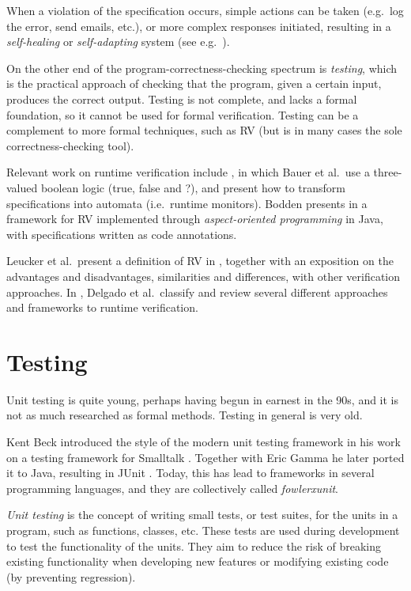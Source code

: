 \documentclass[a4paper,11pt]{kth-mag}
\begin{document}
When a violation of the specification occurs, simple actions can be taken
(e.g.\ log the error, send emails, etc.), or more complex responses initiated,
resulting in a \textit{self-healing} or \textit{self-adapting} system (see
e.g.\ \cite{huebscher08}).

On the other end of the program-correctness-checking spectrum is
\emph{testing}, which is the practical approach of checking that the program,
given a certain input, produces the correct output.  Testing is not complete,
and lacks a formal foundation, so it cannot be used for formal verification.
Testing can be a complement to more formal techniques, such as RV (but is in
many cases the sole correctness-checking tool).

Relevant work on runtime verification include \cite{bauer06}, in which Bauer et
al.\ use a three-valued boolean logic (true, false and ?), and present how to
transform specifications into automata (i.e.\ runtime monitors). Bodden
presents in \cite{bodden05efficientrv} a framework for RV implemented through
\emph{aspect-oriented programming} \cite{aspectj} in Java, with specifications
written as code annotations.

Leucker et al.\ present a definition of RV in \cite{leucker09abriefaccount},
together with an exposition on the advantages and disadvantages, similarities
and differences, with other verification approaches. In
\cite{delgado04taxonomy}, Delgado et al.\ classify and review several different
approaches and frameworks to runtime verification.


\section{Testing}

Unit testing is quite young, perhaps having begun in earnest in the 90s, and it
is not as much researched as formal methods. Testing in general is very old.

Kent Beck introduced the style of the modern unit testing framework in his work
on a testing framework  for Smalltalk \cite{becksmalltalktesting}.  Together
with Eric Gamma he later ported it to Java, resulting in JUnit \cite{junit}.
Today, this has lead to frameworks in several programming languages, and they
are collectively called \textit{fowlerxunit}.

\textit{Unit testing} is the concept of writing small tests, or test suites,
for the units in a program, such as functions, classes, etc. These tests are
used during development to test the functionality of the units. They aim to
reduce the risk of breaking existing functionality when developing new features
or modifying existing code (by preventing regression).
\end{document}
